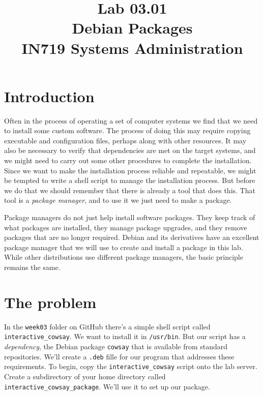 \documentclass{article}
\begin{document}
\title{Lab 03.01\\Debian Packages\\IN719 Systems Administration}
\date{}
\maketitle

\section{Introduction}
Often in the process of operating a set of computer systems we find that we need to
install some custom software. The process of doing this may require copying executable 
and configuration files, perhaps along with other resources. It may also be 
necessary to verify that dependencies are met on the target systems, 
and we might need to carry out some other procedures to complete the installation.
Since we want to make the installation process reliable and repeatable, we might be 
tempted to write a shell script to manage the installation process. But before we 
do that we should remember that there is already a tool that does this. That tool
is a \emph{package manager}, and to use it we just need to make a package.

Package managers do not just help install software packages. They keep track of what
packages are installed, they manage package upgrades, and they remove packages that
are no longer required. Debian and its derivatives have an excellent package manager that 
we will use to create and install a package in this lab. While other distributions use
different package managers, the basic principle remains the same.  

\section{The problem}
In the \texttt{week03} folder on GitHub there's a simple shell script called \texttt{interactive\_cowsay}. We want to
install it in \texttt{/usr/bin}. But our script has a \emph{dependency}, the Debian package \texttt{cowsay} that is available from
standard repositories. We'll create a \texttt{.deb} fille for our program that addresses these requirements. To
begin, copy the \texttt{interactive\_cowsay} script onto the lab server. Create a subdirectory of your home
directory called \texttt{interactive\_cowsay\_package}. We'll use it to set up our package.
\end{document}
